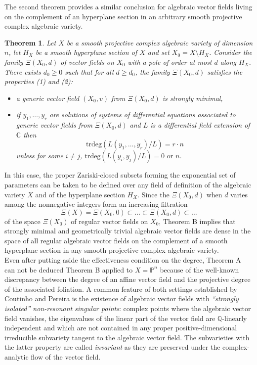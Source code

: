 \documentclass[12pt]{amsart}
\theoremstyle{definition}
\theoremstyle{plain}
\theoremstyle{exampstyle}
\newtheorem{thmx}{Theorem}
\theoremstyle{exampstyle}\newtheorem{thmxbis}{Theorem}
\numberwithin{equation}{section}
\theoremstyle{remark}
\begin{document}
The second theorem provides a similar conclusion for algebraic vector fields living on the complement of an hyperplane section in an arbitrary smooth projective complex algebraic variety. 


\begin{thmx} 
Let $X$ be a smooth projective complex algebraic variety of dimension $n$, let $H_X$ be a smooth hyperplane section of $X$ and set $X_0 = X \setminus H_X$. Consider the family $\Xi(X_0,d)$ of vector fields on $X_0$ with a pole of order at most $d$ along $H_X$. There exists $d_0 \geq 0$ such that for all $d \geq d_0$, the family $\Xi(X_0,d)$ satisfies the properties (1) and (2): 
\begin{itemize} 
\item[(1)] a {\em generic} vector field $(X_0,v)$ from $\Xi(X_0,d)$  is strongly minimal,
\item[(2)] if $y_1,\ldots, y_r$ are  solutions of systems of differential equations associated to {\em generic} vector fields from $\Xi(X_0,d)$ and $L$ is a differential field extension of $\mathbb{C}$ then
$$ \mathrm{trdeg}(L(y_1,\ldots, y_r)/L) = r \cdot n $$
unless for some $i \neq j$, $\mathrm{trdeg}(L( y_i,y_j)/L) =  0 \text{ or } n$.
\end{itemize}
\end{thmx}  

In this case, the proper Zariski-closed subsets forming the exponential set of parameters can be taken to be defined over any field of definition of the algebraic variety $X$ and of the hyperplane section $H_X$. Since the $\Xi(X_0,d)$ when $d$ varies among the nonnegative integers form an increasing filtration 
$$\Xi(X) = \Xi(X_0,0) \subset \ldots \subset \Xi(X_0,d) \subset \ldots $$
of the space $\Xi(X_0)$ of regular vector fields on $X_0$, Theorem B implies that strongly minimal and geometrically trivial algebraic vector fields are dense in the space of all regular algebraic vector fields on the complement of a smooth hyperplane section in any smooth projective complex-algebraic variety. \\


Even after putting aside the effectiveness condition on the degree, Theorem A can not be deduced Theorem B applied to $X = \mathbb{P}^n$ because of the well-known discrepancy between the degree of an affine vector field and the projective degree of the associated foliation. A common feature of both settings established by Coutinho and Pereira \cite{Coutinho-Pereira, Coutinho} is  the existence of algebraic vector fields with {\em ``strongly isolated'' non-resonant singular points}: complex points where the algebraic vector field vanishes, the eigenvalues of the linear part of the vector field are $\mathbb{Q}$-linearly independent and which are not contained in any proper positive-dimensional irreducible subvariety tangent to the algebraic vector field. The subvarieties with the latter property are called {\em invariant} as they are preserved under the complex-analytic flow of the vector field. 
\end{document}
